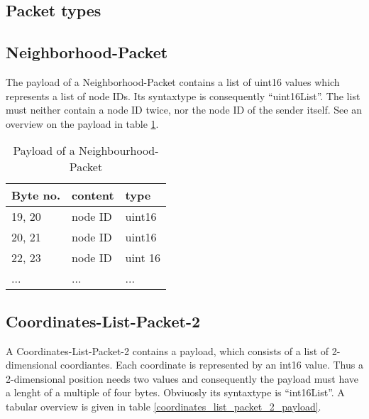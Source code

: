 \subsection{Packet types}
\label{packet_types}

\subsection{Neighborhood-Packet}
\label{subsection:neighbourhood_packet}

The payload of a Neighborhood-Packet contains a list of uint16 values which represents a list of node IDs.
Its syntaxtype is consequently ``uint16List''. The list must neither contain a node ID twice, nor the node
ID of the sender itself. See an overview on the payload in table \ref{neighbourhood_packet_payload}.

\begin{table}[htdp]
  \begin{center}
    \begin{tabular}{l|l|l}
      \textbf{Byte no.} & \textbf{content} & \textbf{type} \\
      \hline
      \hline
      19, 20 & node ID & uint16 \\
      \hline
      20, 21 & node ID & uint16 \\
      \hline
      22, 23 & node ID & uint 16 \\
      \hline
      ... & ... & ... \\
    \end{tabular}
    \caption{Payload of a Neighbourhood-Packet}
    \label{neighbourhood_packet_payload}
  \end{center}
\end{table}

\subsection{Coordinates-List-Packet-2}
\label{subsection:coordiantes-list-packet-2}

A Coordinates-List-Packet-2 contains a payload, which consists of a list of 2-dimensional coordiantes. Each coordinate is
represented by an int16 value. Thus a 2-dimensional position needs two values and consequently the payload must have a lenght
of a multiple of four bytes. Obviuosly its syntaxtype is ``int16List''. A tabular overview is given in table
\ref{coordinates_list_packet_2_payload}.

